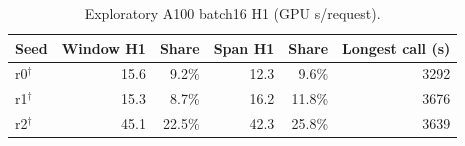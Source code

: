 
\begin{table}[t]
\caption{Exploratory A100 batch16 H1 (GPU s/request).}
\label{tab:a100-followup}
\centering\small\setlength{\tabcolsep}{4pt}
\begin{tabular}{lrrrrr}
\toprule
Seed & Window H1 & Share & Span H1 & Share & Longest call (s) \\
\midrule
r0$^\dagger$ & 15.6 & 9.2\% & 12.3 & 9.6\% & 3292 \\
r1$^\dagger$ & 15.3 & 8.7\% & 16.2 & 11.8\% & 3676 \\
r2$^\dagger$ & 45.1 & 22.5\% & 42.3 & 25.8\% & 3639 \\
\bottomrule
\end{tabular}
\end{table}
